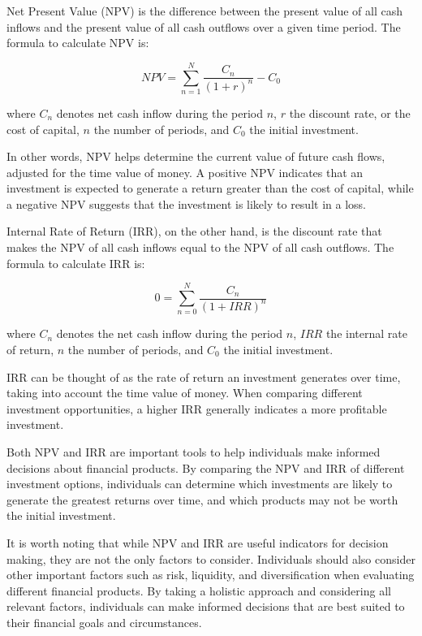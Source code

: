 Net Present Value (NPV) is the difference between the present value of all cash inflows and the present value of all cash outflows over a given time period. The formula to calculate NPV is:

\[ NPV = \sum_{n=1}^{N} \frac{C_n}{(1+r)^n} - C_0 \]

where \(C_n\) denotes net cash inflow during the period \(n\), \(r\) the discount rate, or the cost of capital, \(n\) the number of periods, and \(C_0\) the initial investment.

In other words, NPV helps determine the current value of future cash flows, adjusted for the time value of money. A positive NPV indicates that an investment is expected to generate a return greater than the cost of capital, while a negative NPV suggests that the investment is likely to result in a loss.

Internal Rate of Return (IRR), on the other hand, is the discount rate that makes the NPV of all cash inflows equal to the NPV of all cash outflows. The formula to calculate IRR is:

\[ 0 = \sum_{n=0}^{N} \frac{C_n}{(1+IRR)^n}  \]

where \(C_n\) denotes the net cash inflow during the period \(n\), \(IRR\) the internal rate of return, \(n\) the number of periods, and \(C_0\) the initial investment.

IRR can be thought of as the rate of return an investment generates over time, taking into account the time value of money. When comparing different investment opportunities, a higher IRR generally indicates a more profitable investment.

Both NPV and IRR are important tools to help individuals make informed decisions about financial products. By comparing the NPV and IRR of different investment options, individuals can determine which investments are likely to generate the greatest returns over time, and which products may not be worth the initial investment.

It is worth noting that while NPV and IRR are useful indicators for decision making, they are not the only factors to consider. Individuals should also consider other important factors such as risk, liquidity, and diversification when evaluating different financial products. By taking a holistic approach and considering all relevant factors, individuals can make informed decisions that are best suited to their financial goals and circumstances.


